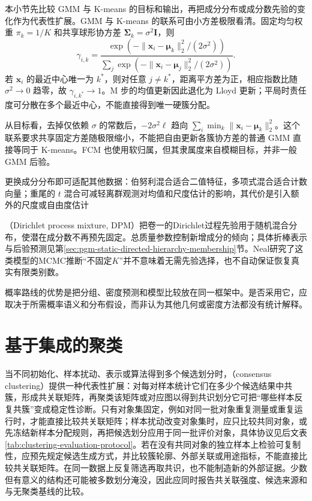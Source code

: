 本小节先比较 GMM 与 K-means 的目标和输出，再把成分分布或成分数先验的变化作为代表性扩展。GMM 与 K-means 的联系可由小方差极限看清。固定均匀权重 $\pi_k=1/K$ 和共享球形协方差 $\bm{\Sigma}_k=\sigma^2\bm{I}$，则
\[
 \gamma_{i,k}=
 \frac{\exp(-\lVert\bm{x}_i-\bm{\mu}_k\rVert_2^2/(2\sigma^2))}
 {\sum_j\exp(-\lVert\bm{x}_i-\bm{\mu}_j\rVert_2^2/(2\sigma^2))}.
\]
若 $\bm{x}_i$ 的最近中心唯一为 $k^\ast$，则对任意 $j\ne k^\ast$，距离平方差为正，相应指数比随 $\sigma^2\to0$ 趋零，故 $\gamma_{i,k^\ast}\to1$。M 步的均值更新因此退化为 Lloyd 更新；平局时责任度可分散在多个最近中心，不能直接得到唯一硬簇分配。

从目标看，去掉仅依赖 $\sigma$ 的常数后，$-2\sigma^2\ell$ 趋向 $\sum_i\min_k\lVert\bm{x}_i-\bm{\mu}_k\rVert_2^2$。这个联系要求共享固定方差随极限缩小，不能把自由更新各簇协方差的普通 GMM 直接等同于 K-means。FCM 也使用软归属，但其隶属度来自模糊目标，并非一般 GMM 后验。

更换成分分布即可适配其他数据：伯努利混合适合二值特征，多项式混合适合计数向量；重尾的 $t$ 混合可减轻离群观测对均值和尺度估计的影响，其代价是引入额外的尺度或自由度估计

（Dirichlet process mixture, DPM）把卷一的Dirichlet过程先验用于随机混合分布，使潜在成分数不再预先固定。总质量参数控制新增成分的倾向；具体折棒表示与后验预测见第\ref{sec:pgm-static-directed-hierarchy-membership}节。Neal研究了这类模型的MCMC推断“不固定$K$”并不意味着无需先验选择，也不自动保证恢复真实有限类别数。

概率路线的优势是把分组、密度预测和模型比较放在同一框架中。是否采用它，应取决于所需概率语义和分布假设，而非认为其他几何或密度方法都没有统计解释。

\section{基于集成的聚类}
\label{sec:clustering-ensemble}

当不同初始化、样本扰动、表示或算法得到多个候选划分时，（consensus clustering）提供一种代表性扩展：对每对样本统计它们在多少个候选结果中共簇，形成共关联矩阵，再聚类该矩阵或对应图以得到共识划分它可把“哪些样本反复共簇”变成稳定性诊断。只有对象集固定，例如对同一批对象重复测量或重复运行时，才能直接比较共关联矩阵；样本扰动改变对象集时，应只比较共同对象，或先冻结新样本分配规则，再把候选划分应用于同一批评价对象，具体协议见后文表\ref{tab:clustering-evaluation-protocol}。若在没有共同对象的独立样本上检验可复制性，应预先规定候选生成方式，并比较簇轮廓、外部关联或用途指标，不能直接比较共关联矩阵。在同一数据上反复筛选再取共识，也不能制造新的外部证据。少数但有意义的结构还可能被多数划分淹没，因此应同时报告共关联强度、候选来源和与无聚类基线的比较。

